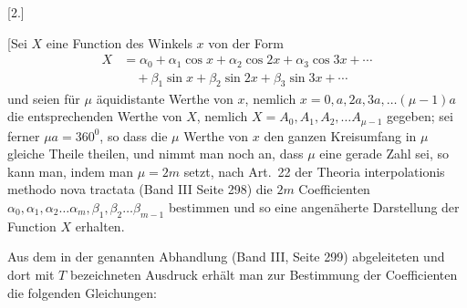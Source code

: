 \clearpage
\begin{landscape}
\begingroup
\fontsize{9.5}{12}\selectfont
{}
\renewcommand{\headrulewidth}{0pt}
\makeatletter\tagsleft@true\let\veqno\@@leqno\makeatother
\setlength{\lineskip}{4pt}\setlength{\lineskiplimit}{4pt}
\begin{center}[2.]\end{center}
\newcommand{\VtwoLowPoint}{\makebox[0pt][l]{\kern-.05em\raisebox{-.4ex}{\rule{.065em}{.065em}}}}
\newcommand{\VtwoMarkedSin}{\mathop{\mathrm{sin}\text{\llap{\raisebox{-.6ex}{\rule{.06em}{.06em}}\kern.1em}}}}
\newcommand{\VtwoMarkedL}{\mathord{L\text{\rlap{\kern.06em\raisebox{1.2ex}{\rule{.06em}{.06em}}}}}}
\newcommand{\VtwoLeader}{\mathord{.}\,\mathord{.}\,\mathord{.}\,\mathord{.}\,\mathord{.}\,\mathord{.}\,\mathord{.}\,\mathord{.}\,\mathord{.}\,\mathord{.}\,\mathord{.}\,\mathord{.}\,\mathord{.}\,\mathord{.}\,\mathord{.}\,\mathord{.}\,\mathord{.}\,\mathord{.}\,\mathord{.}\,\mathord{.}\,\mathord{.}\,\mathord{.}\,\mathord{.}\,\mathord{.}\,\mathord{.}}
\par\noindent\hspace*{\parindent}[Sei \(X\) eine Function des Winkels \(x\) von der Form
\[
\begin{aligned} X &= \alpha_0 + \alpha_1\cos x + \alpha_2\cos 2x + \alpha_3\cos 3x + \cdots \\ &\quad + \beta_1\sin x + \beta_2\sin 2x + \beta_3\sin 3x + \cdots \end{aligned}
\]
und seien f\"ur \(\mu\) \"aquidistante Werthe von \(x\), nemlich \(x=0, a, 2a, 3a, \ldots (\mu-1)a\) die entsprechenden Werthe von \(X\), nemlich \(X = A_0, A_1, A_2, \ldots A_{\mu-1}\) gegeben; sei ferner \(\mu a = 360^{0}\), so dass die \(\mu\) Werthe von \(x\) den ganzen Kreisumfang in \(\mu\) gleiche Theile theilen, und nimmt man noch an, dass \(\mu\) eine gerade Zahl sei, so kann man, indem man \(\mu = 2m\) setzt, nach Art.\ 22 der Theoria interpolationis methodo nova tractata (Band III Seite 298) die \(2m\) Coefficienten \(\alpha_0, \alpha_1, \alpha_2 \ldots \alpha_m, \beta_1, \beta_2 \ldots \beta_{m-1}\) bestimmen und so eine angen\"aherte Darstellung der Function \(X\) erhalten.
\par\noindent\hspace*{\parindent}Aus dem in der genannten Abhandlung (Band III, Seite 299) abgeleiteten und dort mit \(T\) bezeichneten Ausdruck erh\"alt man zur Bestimmung der Coefficienten die folgenden Gleichungen:

\end{landscape}
